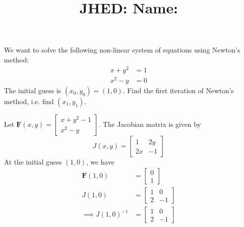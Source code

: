 \documentclass[reqno]{exam}
\title{\normalsize{
  JHED: \underline{\hspace{4cm}} \hspace{1em} Name: \underline{\hspace{9cm}}}
   }
\author{}
\date{}
\begin{document}
\maketitle
\vspace{-2cm} %

\begin{questions}


  \question[10]
  We want to solve the following non-linear system of equations using Newton's method:
  \begin{align*}
    x + y^2 & = 1 \\
    x^2 - y & = 0
  \end{align*}
  The initial guess is $(x_0, y_0) = (1, 0)$. Find the first iteration of Newton's method, i.e. find $(x_1, y_1)$.

  \begin{solution}
    Let $\mathbf{F}(x, y) = \begin{bmatrix} x + y^2 - 1 \\ x^2 - y \end{bmatrix}$. The Jacobian matrix is given by
    \[J(x, y) = \begin{bmatrix} 1 & 2y \\ 2x & -1 \end{bmatrix}\]
    At the initial guess $(1, 0)$, we have
    \begin{align*}
      \mathbf{F}(1, 0) & = \begin{bmatrix} 0 \\ 1 \end{bmatrix}          \\
      J(1, 0)          & = \begin{bmatrix} 1 & 0 \\ 2 & -1 \end{bmatrix} \\
      \implies
      J(1, 0)^{-1}     & = \begin{bmatrix} 1 & 0 \\ 2 & -1 \end{bmatrix}
    \end{align*}


\end{solution}
\end{questions}
\end{document}
